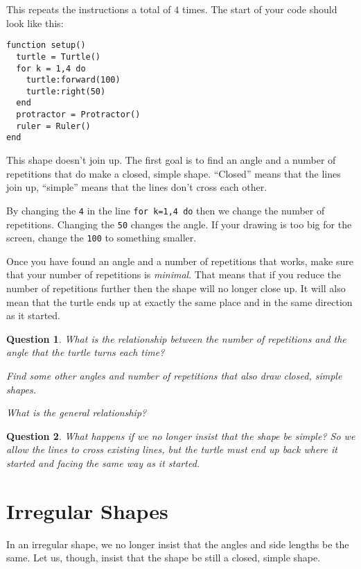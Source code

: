 \documentclass[
  xhtml,%
  use filename%
]{internet}
\newtheorem{question}{Question}
\begin{document}
This repeats the instructions a total of \(4\) times.
The start of your code should look like this:

\begin{verbatim}
function setup()
  turtle = Turtle()
  for k = 1,4 do
    turtle:forward(100)
    turtle:right(50)
  end
  protractor = Protractor()
  ruler = Ruler()
end
\end{verbatim}


This shape doesn't join up.
The first goal is to find an angle and a number of repetitions that do make a closed, simple shape.
``Closed'' means that the lines join up, ``simple'' means that the lines don't cross each other.

By changing the \verb+4+ in the line \verb+for k=1,4 do+ then we change the number of repetitions.
Changing the \verb+50+ changes the angle.
If your drawing is too big for the screen, change the \verb+100+ to something smaller.

Once you have found an angle and a number of repetitions that works, make sure that your number of repetitions is \emph{minimal}.
That means that if you reduce the number of repetitions further then the shape will no longer close up.
It will also mean that the turtle ends up at exactly the same place and in the same direction as it started.

\begin{question}
What is the relationship between the number of repetitions and the angle that the turtle turns each time?

Find some other angles and number of repetitions that also draw closed, simple shapes.

What is the general relationship?
\end{question}

\begin{question}
What happens if we no longer insist that the shape be \emph{simple}?
So we allow the lines to cross existing lines, but the turtle must end up back where it started and facing the same way as it started.
\end{question}

\section{Irregular Shapes}

In an irregular shape, we no longer insist that the angles and side lengths be the same.
Let us, though, insist that the shape be still a closed, simple shape.
\end{document}
